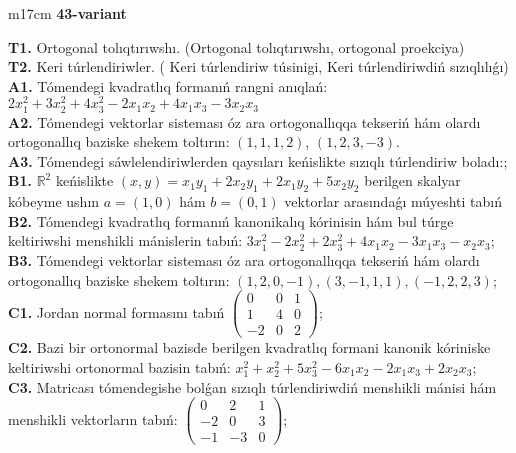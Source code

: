 \documentclass{article}
\begin{document}
\begin{tabular}{m{17cm}}
\textbf{43-variant}
\newline

\textbf{T1.} Ortogonal  tolıqtırıwshı. (Ortogonal tolıqtırıwshı,  ortogonal proekciya) \\
\textbf{T2.} Keri túrlendiriwler. ( Keri túrlendiriw túsinigi,   Keri túrlendiriwdiń sızıqlılıǵı) \\
\textbf{A1.} Tómendegi kvadratlıq formanıń rangni anıqlań: \(2x_{1}^{2} + 3x_{2}^{2} + 4x_{3}^{2} - 2x_{1}x_{2} + 4x_{1}x_{3} - 3x_{2}x_{3}\) \\
\textbf{A2.} Tómendegi vektorlar sisteması óz ara ortogonallıqqa tekseriń hám olardı ortogonallıq baziske shekem toltırın: \((1,1,1,2)\), \((1,2,3, - 3)\). \\
\textbf{A3.} Tómendegi sáwlelendiriwlerden qaysıları keńislikte sızıqlı túrlendiriw boladı:; \\
\textbf{B1.} \(\mathbb{R}^{2}\) keńislikte \((x,y) = x_{1}y_{1} + 2x_{2}y_{1} + 2x_{1}y_{2} + 5x_{2}y_{2}\) berilgen skalyar kóbeyme ushın \(a = (1,0)\) hám \(b = (0,1)\) vektorlar arasındaǵı múyeshti tabıń \\
\textbf{B2.} Tómendegi kvadratlıq formanıń kanonikalıq kórinisin hám bul túrge keltiriwshi menshikli mánislerin tabıń: \(3x_{1}^{2} - 2x_{2}^{2} + 2x_{3}^{2} + 4x_{1}x_{2} - 3x_{1}x_{3} - x_{2}x_{3}\); \\
\textbf{B3.} Tómendegi vektorlar sisteması óz ara ortogonallıqqa tekseriń hám olardı ortogonallıq baziske shekem toltırın: \((1,2,0, - 1),(3, - 1,1,1),( - 1,2,2,3)\); \\
\textbf{C1.} Jordan normal formasını tabıń \(\begin{pmatrix} 0 & 0 & 1 \\ 1 & 4 & 0 \\  - 2 & 0 & 2 \end{pmatrix}\); \\
\textbf{C2.} Bazi bir ortonormal bazisde berilgen kvadratlıq formani kanonik kóriniske keltiriwshi ortonormal bazisin tabıń: \(x_{1}^{2} + x_{2}^{2} + 5x_{3}^{2} - 6x_{1}x_{2} - 2x_{1}x_{3} + 2x_{2}x_{3}\); \\
\textbf{C3.} Matricası tómendegishe bolǵan sızıqlı túrlendiriwdiń menshikli mánisi hám menshikli vektorların tabıń: \(\begin{pmatrix} 0 & 2 & 1 \\  - 2 & 0 & 3 \\  - 1 & - 3 & 0 \end{pmatrix}\); \\

\end{tabular}
\vspace{1cm}
\end{document}
